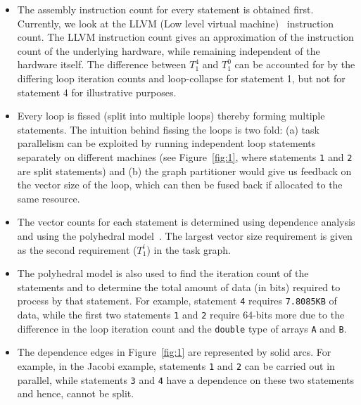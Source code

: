 \begin{itemize}

\item The assembly instruction count for every statement is obtained
  first. Currently, we look at the LLVM (Low level virtual
  machine)~\cite{clat04} instruction count. %
  The LLVM instruction count gives an approximation of the instruction
  count of the underlying hardware, while remaining independent of the
  hardware itself. The difference between $T^4_1$ and $T^0_1$ can be
  accounted for by the differing loop iteration counts and loop-collapse
  for statement 1, but not for statement 4 for illustrative purposes.

\item Every loop is fissed (split into multiple loops) thereby forming
  multiple statements. The intuition behind fissing the loops is two
  fold: (a) task parallelism can be exploited by running independent
  loop statements separately on different machines (see
  Figure~\ref{fig:1}, where statements \texttt{1} and \texttt{2} are
  split statements) and (b) the graph partitioner would give us feedback
  on the vector size of the loop, which can then be fused back if
  allocated to the same resource.

\item The vector counts for each statement is determined using
  dependence analysis and using the polyhedral model~\cite{mgri98}. The
  largest vector size requirement is given as the second requirement
  ($T^i_1$) in the task graph.

\item The polyhedral model is also used to find the iteration count of
  the statements and to determine the total amount of data (in bits)
  required to process by that statement. For example, statement
  \texttt{4} requires \texttt{7.8085KB} of data, while the first two
  statements \texttt{1} and \texttt{2} require 64-bits more due to the
  difference in the loop iteration count and the \texttt{double} type of
  arrays \texttt{A} and \texttt{B}. %

\item The dependence edges in Figure~\ref{fig:1} are represented by solid
arcs. For example, in the Jacobi example, statements \texttt{1} and
  \texttt{2} can be carried out in parallel, while statements
  \texttt{3} and \texttt{4} have a dependence on these two statements
  and hence, cannot be split.

\end{itemize}

